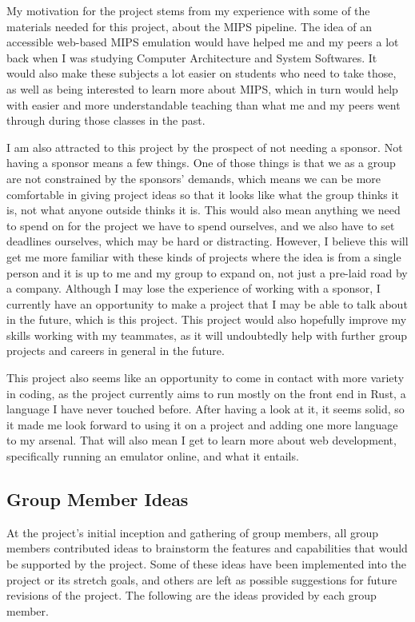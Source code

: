 \documentclass[
    paper=letter,
    parskip=half,
    fontsize=12pt,
    titlepage=firstiscover,
    toc=bibliography,
    numbers=endperiod
]{scrartcl}
\begin{document}
My motivation for the project stems from my experience with some of the materials needed for this project, about the MIPS pipeline. The idea of an accessible web-based MIPS emulation would have helped me and my peers a lot back when I was studying Computer Architecture and System Softwares. It would also make these subjects a lot easier on students who need to take those, as well as being interested to learn more about MIPS, which in turn would help with easier and more understandable teaching than what me and my peers went through during those classes in the past.

I am also attracted to this project by the prospect of not needing a sponsor. Not having a sponsor means a few things. One of those things is that we as a group are not constrained by the sponsors' demands, which means we can be more comfortable in giving project ideas so that it looks like what the group thinks it is, not what anyone outside thinks it is. This would also mean anything we need to spend on for the project we have to spend ourselves, and we also have to set deadlines ourselves, which may be hard or distracting. However, I believe this will get me more familiar with these kinds of projects where the idea is from a single person and it is up to me and my group to expand on, not just a pre-laid road by a company. Although I may lose the experience of working with a sponsor, I currently have an opportunity to make a project that I may be able to talk about in the future, which is this project. This project would also hopefully improve my skills working with my teammates, as it will undoubtedly help with further group projects and careers in general in the future.

This project also seems like an opportunity to come in contact with more variety in coding, as the project currently aims to run mostly on the front end in Rust, a language I have never touched before. After having a look at it, it seems solid, so it made me look forward to using it on a project and adding one more language to my arsenal. That will also mean I get to learn more about web development, specifically running an emulator online, and what it entails.



\subsection{Group Member Ideas}
At the project's initial inception and gathering of group members, all group members contributed ideas to brainstorm the features and capabilities that would be supported by the project. Some of these ideas have been implemented into the project or its stretch goals, and others are left as possible suggestions for future revisions of the project. The following are the ideas provided by each group member.
\end{document}
